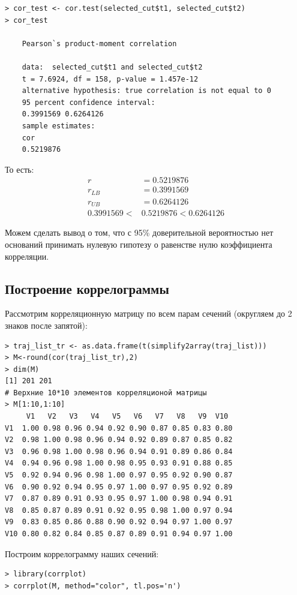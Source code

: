 \documentclass[14pt,a4paper]{scrartcl}
\begin{document}
\begin{verbatim}
> cor_test <- cor.test(selected_cut$t1, selected_cut$t2)
> cor_test

	Pearson`s product-moment correlation
	
	data:  selected_cut$t1 and selected_cut$t2
	t = 7.6924, df = 158, p-value = 1.457e-12
	alternative hypothesis: true correlation is not equal to 0
	95 percent confidence interval:
	0.3991569 0.6264126
	sample estimates:
	cor 
	0.5219876 
\end{verbatim}

То есть:
\begin{align*}
	r &= 0.5219876 \\
	r_{LB} &= 0.3991569\\
	r_{UB} &= 0.6264126\\
	0.3991569 < &0.5219876 <0.6264126
\end{align*}

Можем сделать вывод о том, что с 95\% доверительной вероятностью нет оснований принимать нулевую гипотезу о равенстве нулю коэффициента корреляции.


\pagebreak
\subsection*{Построение коррелограммы}

Рассмотрим корреляционную матрицу по всем парам сечений (округляем до 2 знаков после запятой):

\begin{verbatim}
> traj_list_tr <- as.data.frame(t(simplify2array(traj_list)))
> M<-round(cor(traj_list_tr),2)
> dim(M)
[1] 201 201
# Верхние 10*10 элементов корреляционой матрицы
> M[1:10,1:10]
     V1   V2   V3   V4   V5   V6   V7   V8   V9  V10
V1  1.00 0.98 0.96 0.94 0.92 0.90 0.87 0.85 0.83 0.80
V2  0.98 1.00 0.98 0.96 0.94 0.92 0.89 0.87 0.85 0.82
V3  0.96 0.98 1.00 0.98 0.96 0.94 0.91 0.89 0.86 0.84
V4  0.94 0.96 0.98 1.00 0.98 0.95 0.93 0.91 0.88 0.85
V5  0.92 0.94 0.96 0.98 1.00 0.97 0.95 0.92 0.90 0.87
V6  0.90 0.92 0.94 0.95 0.97 1.00 0.97 0.95 0.92 0.89
V7  0.87 0.89 0.91 0.93 0.95 0.97 1.00 0.98 0.94 0.91
V8  0.85 0.87 0.89 0.91 0.92 0.95 0.98 1.00 0.97 0.94
V9  0.83 0.85 0.86 0.88 0.90 0.92 0.94 0.97 1.00 0.97
V10 0.80 0.82 0.84 0.85 0.87 0.89 0.91 0.94 0.97 1.00
\end{verbatim}

Построим коррелограмму наших сечений:

\begin{verbatim}
> library(corrplot)
> corrplot(M, method="color", tl.pos='n')
\end{verbatim}
\end{document}
